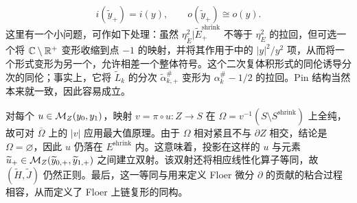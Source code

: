 \begin{equation}\label{eq:18.19}
i(\widetilde y_+)=i(y),\qquad o(\widetilde y_+)\cong o(y).
\end{equation}
这里有一个小问题，可作如下处理：虽然 $\eta_{\widetilde E}^2|\widetilde E^{\mathrm{shrink}}_+$ 不等于 $\eta_E^2$ 的拉回，但可选一个将 $\mathbb C\setminus\mathbb R^+$ 变形收缩到点 $-1$ 的映射，并将其作用于中的 $|y|^2/y^2$ 项，从而将一个形式变形为另一个，允许相差一个整体符号。这个二次复体积形式的同伦诱导分次的同伦；事实上，它将 $\widetilde L_k$ 的分次 $\widetilde\alpha_{k,+}^\#$ 变形为 $\alpha_k^\#-1/2$ 的拉回。Pin 结构当然本来就一致，因此容易成立。

对每个 $u\in\mathcal M_Z(y_0,y_1)$，映射 $v=\pi\circ u:Z\to S$ 在 $\Omega=v^{-1}(S\setminus S^{\mathrm{shrink}})$ 上全纯，故可对 $\overline\Omega$ 上的 $|v|$ 应用最大值原理。由于 $\Omega$ 相对紧且不与 $\partial Z$ 相交，结论是 $\Omega=\varnothing$，因此 $u$ 仍落在 $E^{\mathrm{shrink}}$ 内。这意味着，投影在这样的 $u$ 与元素 $\widetilde u_+\in\mathcal M_Z(\widetilde y_{0,+},\widetilde y_{1,+})$ 之间建立双射。该双射还将相应线性化算子等同，故 $(\widetilde H,\widetilde J)$ 仍然正则。最后，这一等同与用来定义 Floer 微分 $\partial$ 的贡献的粘合过程相容，从而定义了 Floer 上链复形的同构。

